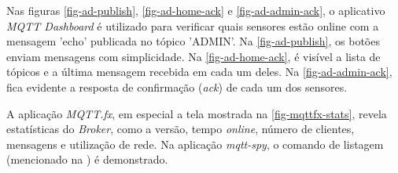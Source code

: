 Nas figuras \ref{fig-ad-publish}, \ref{fig-ad-home-ack} e \ref{fig-ad-admin-ack},
o aplicativo \emph{MQTT Dashboard} é utilizado para verificar quais sensores
estão online com a mensagem 'echo' publicada no tópico 'ADMIN'. Na
\autoref{fig-ad-publish}, os botões enviam mensagens com simplicidade. Na
\autoref{fig-ad-home-ack}, é visível a lista de tópicos e a última mensagem
recebida em cada um deles. Na \autoref{fig-ad-admin-ack}, fica evidente a
resposta de confirmação (\emph{ack}) de cada um dos sensores.

A aplicação \emph{MQTT.fx}, em especial a tela mostrada na
\autoref{fig-mqttfx-stats}, revela estatísticas do \emph{Broker}, como a versão,
tempo \emph{online}, número de clientes, mensagens e utilização de rede.
Na aplicação \emph{mqtt-spy}, o comando de listagem (mencionado na
) é demonstrado.

